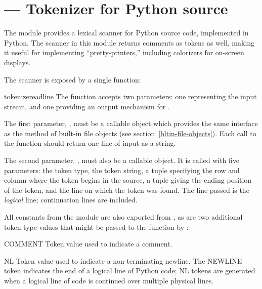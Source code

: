 \section{ ---
         Tokenizer for Python source}



The  module provides a lexical scanner for Python
source code, implemented in Python.  The scanner in this module
returns comments as tokens as well, making it useful for implementing
``pretty-printers,'' including colorizers for on-screen displays.

The scanner is exposed by a single function:


\begin{funcdesc}{tokenize}{readline}
  The  function accepts two parameters: one
  representing the input stream, and one providing an output mechanism 
  for .

  The first parameter, , must be a callable object which
  provides the same interface as the  method of
  built-in file objects (see section~\ref{bltin-file-objects}).  Each
  call to the function should return one line of input as a string.

  The second parameter, , must also be a callable
  object.  It is called with five parameters: the token type, the
  token string, a tuple  specifying the 
  row and column where the token begins in the source, a tuple
   giving the ending position of the
  token, and the line on which the token was found.  The line passed
  is the \emph{logical} line; continuation lines are included.
\end{funcdesc}


All constants from the  module are also exported from 
, as are two additional token type values that might be 
passed to the  function by :

\begin{datadesc}{COMMENT}
  Token value used to indicate a comment.
\end{datadesc}
\begin{datadesc}{NL}
  Token value used to indicate a non-terminating newline.  The NEWLINE
  token indicates the end of a logical line of Python code; NL tokens
  are generated when a logical line of code is continued over multiple
  physical lines.
\end{datadesc}
